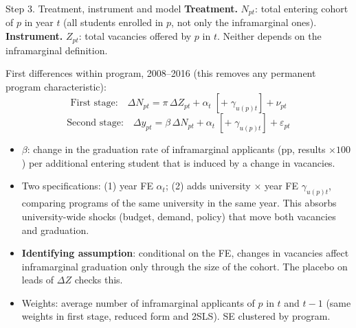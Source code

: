 \documentclass{beamer}
\begin{document}
\begin{frame}{Step 3. Treatment, instrument and model}
\scriptsize
\textbf{Treatment.} $N_{pt}$: total entering cohort of $p$ in year $t$ (all students enrolled in $p$, not only the inframarginal ones).
\textbf{Instrument.} $Z_{pt}$: total vacancies offered by $p$ in $t$. Neither depends on the inframarginal definition.

\vspace{0.1cm}
First differences within program, 2008--2016 (this removes any permanent program characteristic):
\[
\text{First stage:}\quad \Delta N_{pt} = \pi\,\Delta Z_{pt} + \alpha_t \;[+\;\gamma_{u(p)t}] + \nu_{pt}
\]
\[
\text{Second stage:}\quad \Delta y_{pt} = \beta\,\widehat{\Delta N}_{pt} + \alpha_t \;[+\;\gamma_{u(p)t}] + \varepsilon_{pt}
\]
\begin{itemize}
    \item $\beta$: change in the graduation rate of inframarginal applicants (pp, results $\times100$) per additional entering student that is induced by a change in vacancies.
    \item Two specifications: (1) year FE $\alpha_t$; (2) adds university $\times$ year FE $\gamma_{u(p)t}$, comparing programs of the same
    university in the same year. This absorbs university-wide shocks (budget, demand, policy) that move both vacancies and graduation.
    \item \textbf{Identifying assumption}: conditional on the FE, changes in vacancies affect inframarginal graduation only through the size of the cohort.
    The placebo on leads of $\Delta Z$ checks this.
    \item Weights: average number of inframarginal applicants of $p$ in $t$ and $t-1$ (same weights in first stage, reduced form and 2SLS). SE clustered by program.
\end{itemize}
\end{frame}
\end{document}
